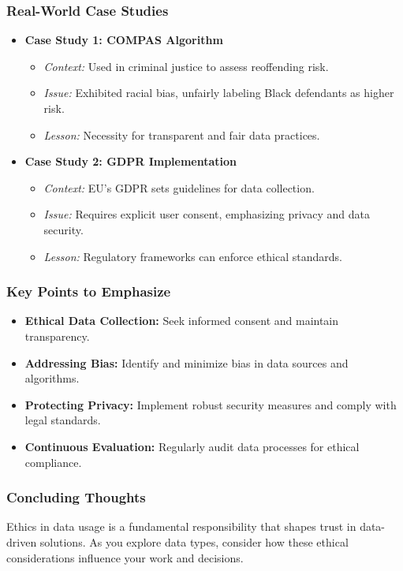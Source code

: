 \documentclass[aspectratio=169]{beamer}
\begin{document}
\begin{frame}[fragile]
    \frametitle{Real-World Case Studies}
    \begin{itemize}
        \item \textbf{Case Study 1: COMPAS Algorithm}
            \begin{itemize}
                \item \textit{Context:} Used in criminal justice to assess reoffending risk.
                \item \textit{Issue:} Exhibited racial bias, unfairly labeling Black defendants as higher risk.
                \item \textit{Lesson:} Necessity for transparent and fair data practices.
            \end{itemize}

        \item \textbf{Case Study 2: GDPR Implementation}
            \begin{itemize}
                \item \textit{Context:} EU's GDPR sets guidelines for data collection.
                \item \textit{Issue:} Requires explicit user consent, emphasizing privacy and data security.
                \item \textit{Lesson:} Regulatory frameworks can enforce ethical standards.
            \end{itemize}
    \end{itemize}
\end{frame}

\begin{frame}[fragile]
    \frametitle{Key Points to Emphasize}
    \begin{itemize}
        \item \textbf{Ethical Data Collection:} Seek informed consent and maintain transparency.
        \item \textbf{Addressing Bias:} Identify and minimize bias in data sources and algorithms.
        \item \textbf{Protecting Privacy:} Implement robust security measures and comply with legal standards.
        \item \textbf{Continuous Evaluation:} Regularly audit data processes for ethical compliance.
    \end{itemize}
\end{frame}

\begin{frame}[fragile]
    \frametitle{Concluding Thoughts}
    Ethics in data usage is a fundamental responsibility that shapes trust in data-driven solutions. As you explore data types, consider how these ethical considerations influence your work and decisions.
\end{frame}
\end{document}
